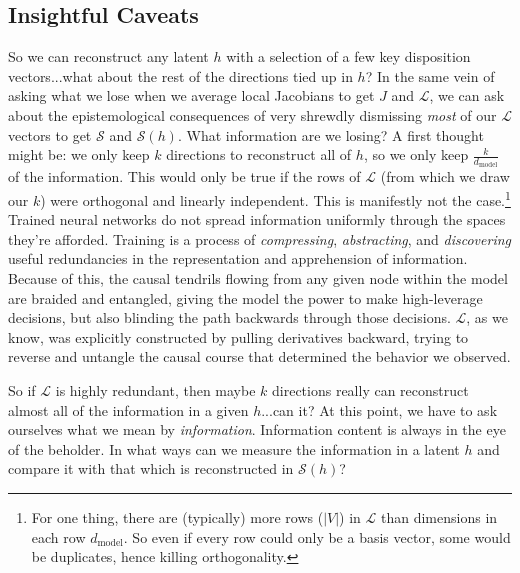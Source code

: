 \documentclass{article}
\newcommand{\jlens}{\mathscr{L}}
\newcommand{\jspace}{\mathscr{S}}
\newcommand{\dmodel}{d_{\text{model}}}
\begin{document}
\subsection{Insightful Caveats}
So we can reconstruct any latent \(h\) with a selection of a few key disposition vectors...what about the rest of the directions tied up in \(h\)? In the same vein of asking what we lose when we average local Jacobians to get \(J\) and \(\jlens\), we can ask about the epistemological consequences of very shrewdly dismissing \textit{most} of our \(\jlens\) vectors to get \(\jspace\) and \(\jspace(h)\). What information are we losing? A first thought might be: we only keep \(k\) directions to reconstruct all of \(h\), so we only keep \(\frac{k}{\dmodel}\) of the information. This would only be true if the rows of \(\jlens\) (from which we draw our \(k\)) were orthogonal and linearly independent. This is manifestly not the case.\footnote{For one thing, there are (typically) more rows (\(|V|\)) in \(\jlens\) than dimensions in each row \(\dmodel\). So even if every row could only be a basis vector, some would be duplicates, hence killing orthogonality.} Trained neural networks do not spread information uniformly through the spaces they're afforded. Training is a process of \textit{compressing}, \textit{abstracting}, and \textit{discovering} useful redundancies in the representation and apprehension of information. Because of this, the causal tendrils flowing from any given node within the model are braided and entangled, giving the model the power to make high-leverage decisions, but also blinding the path backwards through those decisions. \(\jlens\), as we know, was explicitly constructed by pulling derivatives backward, trying to reverse and untangle the causal course that determined the behavior we observed.

So if \(\jlens\) is highly redundant, then maybe \(k\) directions really can reconstruct almost all of the information in a given \(h\)...can it? At this point, we have to ask ourselves what we mean by \textit{information}. Information content is always in the eye of the beholder. In what ways can we measure the information in a latent \(h\) and compare it with that which is reconstructed in \(\jspace(h)\)? 
\end{document}
